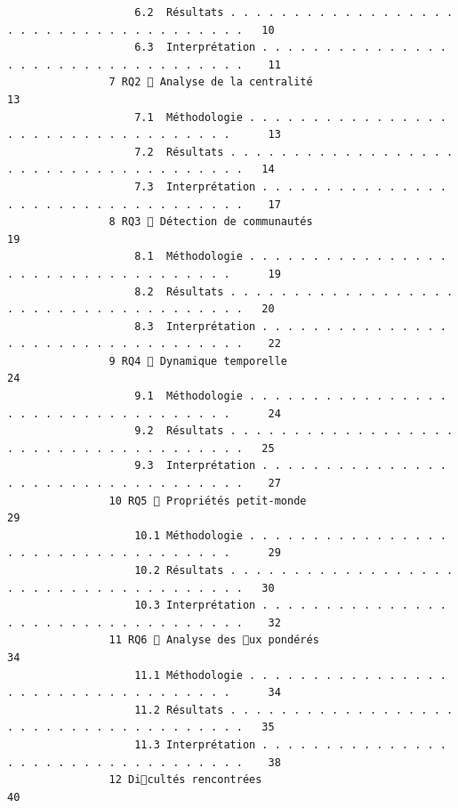 \documentclass[12pt]{article}
\begin{document}
\begin{verbatim}
                    6.2  Résultats . . . . . . . . . . . . . . . . . . . . . . . . . . . . . . . . . . . . .   10
                    6.3  Interprétation . . . . . . . . . . . . . . . . . . . . . . . . . . . . . . . . . .    11
                7 RQ2  Analyse de la centralité                                                              13
                    7.1  Méthodologie . . . . . . . . . . . . . . . . . . . . . . . . . . . . . . . . . .      13
                    7.2  Résultats . . . . . . . . . . . . . . . . . . . . . . . . . . . . . . . . . . . . .   14
                    7.3  Interprétation . . . . . . . . . . . . . . . . . . . . . . . . . . . . . . . . . .    17
                8 RQ3  Détection de communautés                                                              19
                    8.1  Méthodologie . . . . . . . . . . . . . . . . . . . . . . . . . . . . . . . . . .      19
                    8.2  Résultats . . . . . . . . . . . . . . . . . . . . . . . . . . . . . . . . . . . . .   20
                    8.3  Interprétation . . . . . . . . . . . . . . . . . . . . . . . . . . . . . . . . . .    22
                9 RQ4  Dynamique temporelle                                                                  24
                    9.1  Méthodologie . . . . . . . . . . . . . . . . . . . . . . . . . . . . . . . . . .      24
                    9.2  Résultats . . . . . . . . . . . . . . . . . . . . . . . . . . . . . . . . . . . . .   25
                    9.3  Interprétation . . . . . . . . . . . . . . . . . . . . . . . . . . . . . . . . . .    27
                10 RQ5  Propriétés petit-monde                                                               29
                    10.1 Méthodologie . . . . . . . . . . . . . . . . . . . . . . . . . . . . . . . . . .      29
                    10.2 Résultats . . . . . . . . . . . . . . . . . . . . . . . . . . . . . . . . . . . . .   30
                    10.3 Interprétation . . . . . . . . . . . . . . . . . . . . . . . . . . . . . . . . . .    32
                11 RQ6  Analyse des ux pondérés                                                             34
                    11.1 Méthodologie . . . . . . . . . . . . . . . . . . . . . . . . . . . . . . . . . .      34
                    11.2 Résultats . . . . . . . . . . . . . . . . . . . . . . . . . . . . . . . . . . . . .   35
                    11.3 Interprétation . . . . . . . . . . . . . . . . . . . . . . . . . . . . . . . . . .    38
                12 Dicultés rencontrées                                                                      40

\end{verbatim}
\end{document}
